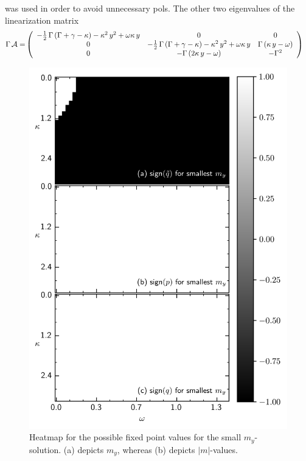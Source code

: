 \documentclass{article}
\begin{document}
was used in order to avoid unnecessary pols.\newpage
The other two eigenvalues of the linearization matrix 
\begin{align*}
    \Gamma\,\mathcal{A}=&\left( \begin{array}{c c c}
        -\frac{1}{2}\,\Gamma\,(\Gamma+\gamma-\kappa)-\kappa^2\,y^2
        +\omega\kappa\,y&0&0\\
        0&-\frac{1}{2}\,\Gamma\,(\Gamma+\gamma-\kappa)-\kappa^2\,y^2
        +\omega\kappa\,y&\Gamma\,(\kappa\,y-\omega)\\
        0&-\Gamma\,(2\kappa\,y-\omega)&-\Gamma^2
    \end{array}  \right)
\end{align*}
\begin{figure}
    \includegraphics{pictures/lam2_anal_s.png}
    \vspace*{-2cm}\caption{Heatmap for the possible fixed point values for the small $m_y$-solution. (a) depicts $m_y$, whereas (b) depicts $|m|$-values.}
    \label{fig:sign_lam23_s}
\end{figure}
\end{document}
